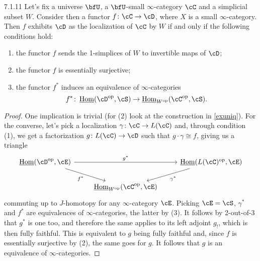 \documentclass[a4paper,12pt]{scrartcl}
\begin{document}
\begin{prop}
  7.1.11
  Let's fix a universe $\bfU$, a $\bfU$-small $\infty$-category $\cC$ and a
  simplicial subset $W$. Consider then a functor $f\colon\cC\rightarrow\cD$,
  where $X$ is a small $\infty$-category. Then $f$ exhibits $\cD$ as the
  localization of $\cC$ by $W$ if and only if the following conditions hold:
  \begin{enumerate}
    \item the functor $f$ sends the 1-simplices of $W$ to invertible maps of
      $\cD$;
    \item the functor $f$ is essentially surjective;
    \item the functor $f^*$ induces an equivalence of $\infty$-categories
      \[f^*\colon\Home(\cD^{\op},\cS)\rightarrow\Home_{W^{\op}}(\cC^{\op},\cS).\]
  \end{enumerate}
\end{prop}
\begin{proof}
  One implication is trivial (for (2) look at the construction in \ref{exuniq}).
  For the converse, let's pick a localization $\gamma\colon\cC\rightarrow
  L(\cC)$ and, through condition (1), we get a factorization $g\colon
  L(\cC)\rightarrow\cD$ such that $g\cdot\gamma\cong f$, giving us a triangle
  \[\begin{tikzcd}
    {\Home(\cD^{\op},\cE)} && {\Home(L(\cC)^{\op},\cE)} \\
                           & {\Home_{W^{\op}}(\cC^{\op},\cE)}
    \arrow["{g^*}", from=1-1, to=1-3]
    \arrow["{f^*}"', from=1-1, to=2-2]
    \arrow["{\gamma^*}", from=1-3, to=2-2]
  \end{tikzcd}\]
  commuting up to $J$-homotopy for any $\infty$-category $\cE$. Picking
  $\cE=\cS$, $\gamma^*$ and $f^*$ are equivalences
  of $\infty$-categories, the latter by (3). It follows by 2-out-of-3 that $g^*$
  is one too, and therefore the same applies to its left adjoint $g_!$, which is
  then fully faithful. This is equivalent to $g$ being fully faithful  and, since
  $f$ is essentially surjective by (2), the same goes for $g$. It follows that
  $g$ is an equivalence of $\infty$-categories.
\end{proof}
\end{document}
